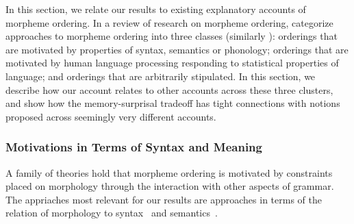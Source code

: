 \documentclass[11pt,letterpaper]{article}
\newcommand{\citep}{\parencite}
\newcommand{\citet}{\Textcite}
\newcommand\mhahn[1]{{\color{red}(#1)}}
\newcommand\becky[1]{{\color{blue}(#1)}}
\begin{document}


In this section, we relate our results to existing explanatory accounts of morpheme ordering.
In a review of research on morpheme ordering, \citet{manova2010modeling} %
categorize approaches to morpheme ordering into three classes (similarly \citet{rice2000morpheme, rice2011principles}): orderings that are motivated by properties of syntax, semantics or phonology; orderings that are motivated by human language processing responding to statistical properties of language; and orderings that are arbitrarily stipulated.
In this section, we describe how our account relates to other accounts across these three clusters, and show how the memory-surprisal tradeoff has tight connections with notions proposed across seemingly very different accounts.





\subsubsection{Motivations in Terms of Syntax and Meaning}

A family of theories hold that morpheme ordering is motivated by constraints placed on morphology through the interaction with other aspects of grammar.
The appriaches most relevant for our results are approaches in terms of the relation of morphology to syntax~\citep{baker1985the} and semantics~\citep{bybee-morphology-1985,rice2000morpheme}.

\end{document}
